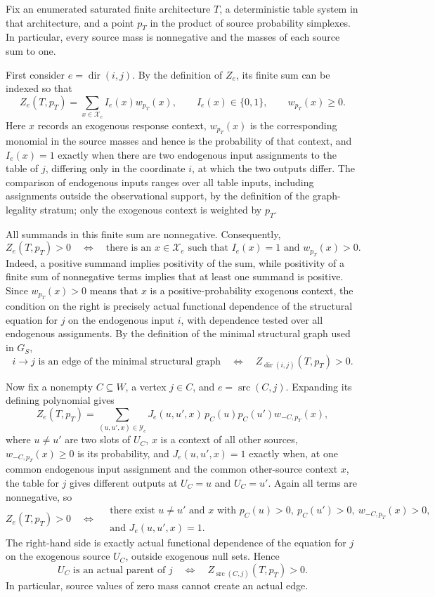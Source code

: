 Fix an enumerated saturated finite architecture \(T\), a deterministic table system in that architecture, and a point \(p_T\) in the product of source probability simplexes.  In particular, every source mass is nonnegative and the masses of each source sum to one.

First consider \(e=\operatorname{dir}(i,j)\).  By the definition of \(Z_e\), its finite sum can be indexed so that
\[
 Z_e(T,p_T)=\sum_{x\in\mathcal X_e} I_e(x)w_{p_T}(x),
 \qquad I_e(x)\in\{0,1\},
 \qquad w_{p_T}(x)\ge 0.
\]
Here \(x\) records an exogenous response context, \(w_{p_T}(x)\) is the corresponding monomial in the source masses and hence is the probability of that context, and \(I_e(x)=1\) exactly when there are two endogenous input assignments to the table of \(j\), differing only in the coordinate \(i\), at which the two outputs differ.  The comparison of endogenous inputs ranges over all table inputs, including assignments outside the observational support, by the definition of the graph-legality stratum; only the exogenous context is weighted by \(p_T\).

All summands in this finite sum are nonnegative.  Consequently,
\[
 Z_e(T,p_T)>0
 \quad\Longleftrightarrow\quad
 \text{there is an }x\in\mathcal X_e\text{ such that }
 I_e(x)=1\text{ and }w_{p_T}(x)>0.
\]
Indeed, a positive summand implies positivity of the sum, while positivity of a finite sum of nonnegative terms implies that at least one summand is positive.  Since \(w_{p_T}(x)>0\) means that \(x\) is a positive-probability exogenous context, the condition on the right is precisely actual functional dependence of the structural equation for \(j\) on the endogenous input \(i\), with dependence tested over all endogenous assignments.  By the definition of the minimal structural graph used in \(G_S\),
\[
 i\longrightarrow j\text{ is an edge of the minimal structural graph}
 \quad\Longleftrightarrow\quad
 Z_{\operatorname{dir}(i,j)}(T,p_T)>0.
\]

Now fix a nonempty \(C\subseteq W\), a vertex \(j\in C\), and \(e=\operatorname{src}(C,j)\).  Expanding its defining polynomial gives
\[
 Z_e(T,p_T)
 =\sum_{(u,u',x)\in\mathcal Y_e}
 J_e(u,u',x)\,p_C(u)p_C(u')w_{-C,p_T}(x),
\]
where \(u\ne u'\) are two slots of \(U_C\), \(x\) is a context of all other sources, \(w_{-C,p_T}(x)\ge0\) is its probability, and \(J_e(u,u',x)=1\) exactly when, at one common endogenous input assignment and the common other-source context \(x\), the table for \(j\) gives different outputs at \(U_C=u\) and \(U_C=u'\).  Again all terms are nonnegative, so
\[
 Z_e(T,p_T)>0
 \quad\Longleftrightarrow\quad
 \begin{gathered}
 \text{there exist }u\ne u'\text{ and }x\text{ with }
 p_C(u)>0,\ p_C(u')>0,\ w_{-C,p_T}(x)>0,\\
 \text{and }J_e(u,u',x)=1.
 \end{gathered}
\]
The right-hand side is exactly actual functional dependence of the equation for \(j\) on the exogenous source \(U_C\), outside exogenous null sets.  Hence
\[
 U_C\text{ is an actual parent of }j
 \quad\Longleftrightarrow\quad
 Z_{\operatorname{src}(C,j)}(T,p_T)>0.
\]
In particular, source values of zero mass cannot create an actual edge.


